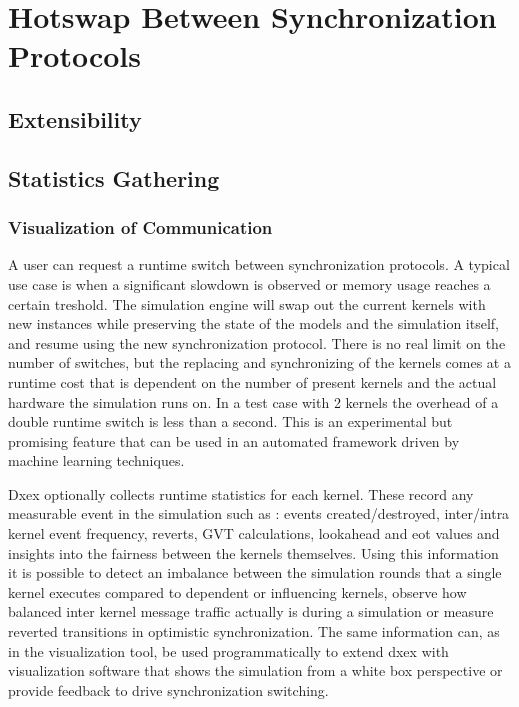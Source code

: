 \section{Hotswap Between Synchronization Protocols}

\subsection{Extensibility}

\subsection{Statistics Gathering}

\subsubsection{Visualization of Communication}

A user can request a runtime switch between synchronization protocols. A typical use case is when a significant slowdown is observed or memory usage reaches a certain treshold. The simulation engine will swap out the current kernels with new instances while preserving the state of the models and the simulation itself, and resume using the new synchronization protocol. There is no real limit on the number of switches, but the replacing and synchronizing of the kernels comes at a runtime cost that is dependent on the number of present kernels and the actual hardware the simulation runs on. In a test case with 2 kernels the overhead of a double runtime switch is less than a second.
This is an experimental but promising feature that can be used in an automated framework driven by machine learning techniques.

Dxex optionally collects runtime statistics for each kernel. These record any measurable event in the simulation such as : events created/destroyed, inter/intra kernel event frequency, reverts, GVT calculations, lookahead and eot values and insights into the fairness between the kernels themselves. Using this information it is possible to detect an imbalance between the simulation rounds that a single kernel executes compared to dependent or influencing kernels, observe how balanced inter kernel message traffic actually is during a simulation or measure reverted transitions in optimistic synchronization.
The same information can, as in the visualization tool, be used programmatically to extend dxex with visualization software that shows the simulation from a white box perspective or provide feedback to drive synchronization switching.

